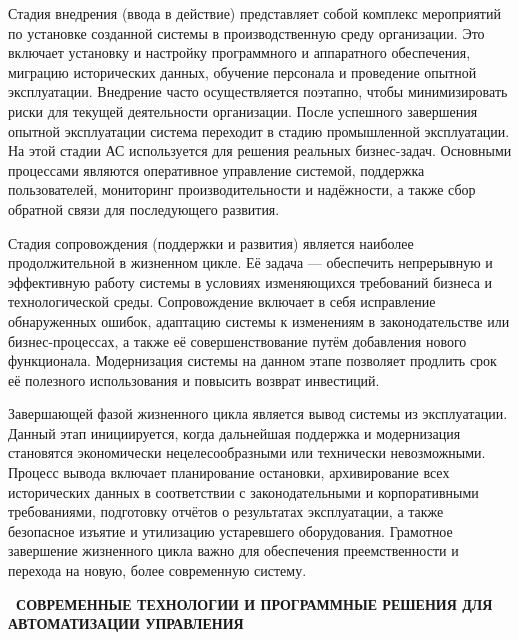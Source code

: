 \documentclass{SibFU-docs}
\begin{document}
Стадия внедрения (ввода в действие) представляет собой комплекс мероприятий по установке созданной системы в производственную среду организации. Это включает установку и настройку программного и аппаратного обеспечения, миграцию исторических данных, обучение персонала и проведение опытной эксплуатации. Внедрение часто осуществляется поэтапно, чтобы минимизировать риски для текущей деятельности организации. После успешного завершения опытной эксплуатации система переходит в стадию промышленной эксплуатации. На этой стадии АС используется для решения реальных бизнес-задач. Основными процессами являются оперативное управление системой, поддержка пользователей, мониторинг производительности и надёжности, а также сбор обратной связи для последующего развития.


Стадия сопровождения (поддержки и развития) является наиболее продолжительной в жизненном цикле. Её задача — обеспечить непрерывную и эффективную работу системы в условиях изменяющихся требований бизнеса и технологической среды. Сопровождение включает в себя исправление обнаруженных ошибок, адаптацию системы к изменениям в законодательстве или бизнес-процессах, а также её совершенствование путём добавления нового функционала. Модернизация системы на данном этапе позволяет продлить срок её полезного использования и повысить возврат инвестиций.

Завершающей фазой жизненного цикла является вывод системы из эксплуатации. Данный этап инициируется, когда дальнейшая поддержка и модернизация становятся экономически нецелесообразными или технически невозможными. Процесс вывода включает планирование остановки, архивирование всех исторических данных в соответствии с законодательными и корпоративными требованиями, подготовку отчётов о результатах эксплуатации, а также безопасное изъятие и утилизацию устаревшего оборудования. Грамотное завершение жизненного цикла важно для обеспечения преемственности и перехода на новую, более современную систему.

\newpage
{}
\begin{center}\textbf{\thesection\ СОВРЕМЕННЫЕ ТЕХНОЛОГИИ И ПРОГРАММНЫЕ РЕШЕНИЯ ДЛЯ АВТОМАТИЗАЦИИ УПРАВЛЕНИЯ}\end{center}
\vspace*{-1.5em}
\end{document}
